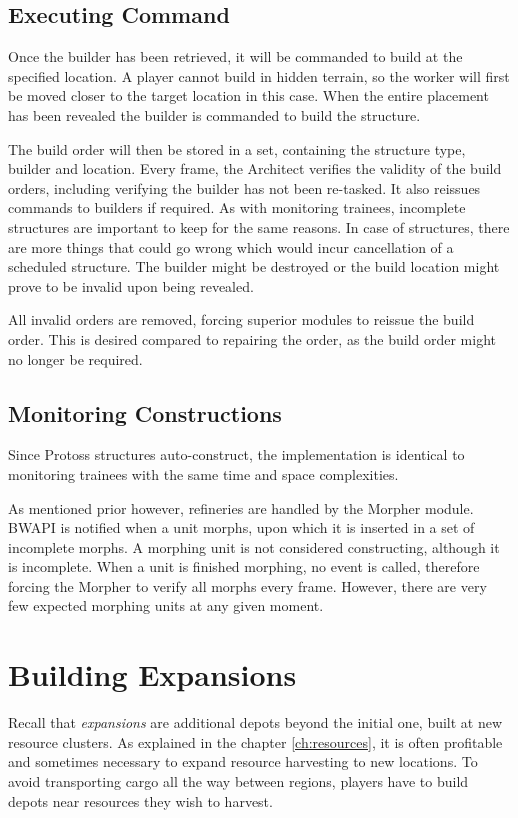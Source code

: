 	\subsection*{Executing Command}
	Once the builder has been retrieved, it will be commanded to build at the specified location. A player cannot build in hidden terrain, so the worker will first be moved closer to the target location in this case. When the entire placement has been revealed the builder is commanded to build the structure.
	
	The build order will then be stored in a set, containing the structure type, builder and location. Every frame, the Architect verifies the validity of the build orders, including verifying the builder has not been re-tasked. It also reissues commands to builders if required. As with monitoring trainees, incomplete structures are important to keep for the same reasons. In case of structures, there are more things that could go wrong which would incur cancellation of a scheduled structure. The builder might be destroyed or the build location might prove to be invalid upon being revealed.
	
	All invalid orders are removed, forcing superior modules to reissue the build order. This is desired compared to repairing the order, as the build order might no longer be required.
	
	\subsection*{Monitoring Constructions}
	Since Protoss structures auto-construct, the implementation is identical to monitoring trainees with the same time and space complexities.
	
	As mentioned prior however, refineries are handled by the Morpher module. BWAPI is notified when a unit morphs, upon which it is inserted in a set of incomplete morphs. A morphing unit is not considered constructing, although it is incomplete. When a unit is finished morphing, no event is called, therefore forcing the Morpher to verify all morphs every frame. However, there are very few expected morphing units at any given moment.

\section{Building Expansions}
\label{sec:buildExpansions}
Recall that \emph{expansions} are additional depots beyond the initial one, built at new resource clusters. As explained in the chapter \ref{ch:resources}, it is often profitable and sometimes necessary to expand resource harvesting to new locations. To avoid transporting cargo all the way between regions, players have to build depots near resources they wish to harvest.

